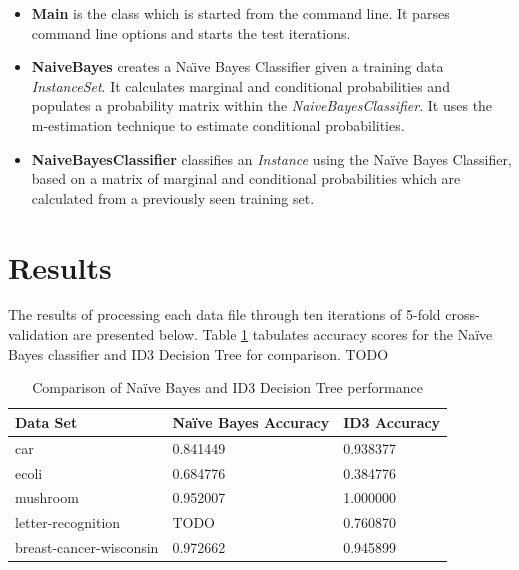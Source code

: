 \documentclass[10pt]{report}
\begin{document}
\begin{itemize}
\item \textbf{Main} is the class which is started from the command
  line. It parses command line options and starts the test iterations.

\item \textbf{NaiveBayes} creates a Na\"{\i}ve Bayes Classifier
  given a training data \textit{InstanceSet}. It calculates marginal
  and conditional probabilities and populates a probability matrix
  within the \textit{NaiveBayesClassifier}. It uses the m-estimation
  technique to estimate conditional probabilities.

\item \textbf{NaiveBayesClassifier} classifies an \textit{Instance}
  using the Na\"{i}ve Bayes Classifier, based on a matrix of
  marginal and conditional probabilities which are calculated from a
  previously seen training set.

\end{itemize}


\section{Results}
\label{sec:results}
The results of processing each data file through ten iterations of
5-fold cross-validation are presented below. Table \ref{tab:comparison} tabulates accuracy scores for the Na\"{i}ve Bayes classifier and ID3 Decision Tree for comparison. TODO

\begin{table}[h]
  \centering
  \begin{tabular}{ |l|l|l|} 
    \hline
    \textbf{Data Set} & \textbf{Na\"{i}ve Bayes Accuracy} & \textbf{ID3 Accuracy} \\ \hline
    car                      &  0.841449  &  0.938377 \\ \hline
    ecoli                    &  0.684776  &  0.384776 \\ \hline
    mushroom                 &  0.952007  &  1.000000 \\ \hline
    letter-recognition       &  TODO      &  0.760870 \\ \hline
    breast-cancer-wisconsin  &  0.972662  &  0.945899 \\ \hline
  \end{tabular}
  \caption{Comparison of Na\"{i}ve Bayes and ID3 Decision Tree performance}
  \label{tab:comparison}
\end{table}
\end{document}
